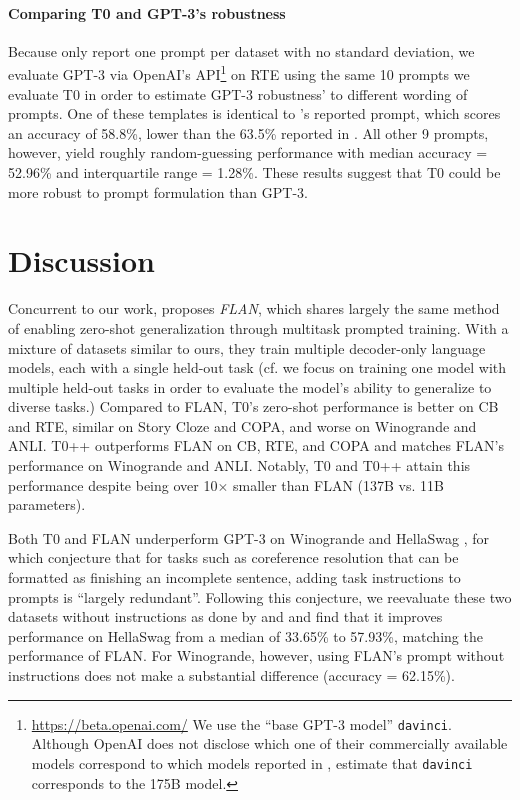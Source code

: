 \paragraph{Comparing T0 and GPT-3's robustness} Because \citet{gpt3} only report one prompt per dataset with no standard deviation, we evaluate GPT-3 via OpenAI's API\footnote{\url{https://beta.openai.com/} We use the “base GPT-3 model” \texttt{davinci}. Although OpenAI does not disclose which one of their commercially available models correspond to which models reported in \citet{gpt3}, \citet{eval-harness} estimate that \texttt{davinci} corresponds to the 175B model.} on RTE using the same 10 prompts we evaluate T0 in order to estimate GPT-3 robustness' to different wording of prompts. One of these templates is identical to \citet[p. 59]{gpt3}'s reported prompt, which scores an accuracy of 58.8\%, lower than the 63.5\% reported in \citet{gpt3}. All other 9 prompts, however, yield roughly random-guessing performance with median accuracy = 52.96\% and interquartile range = 1.28\%. These results suggest that T0 could be more robust to prompt formulation than GPT-3.

\section{Discussion}
\label{sec:disc}

Concurrent to our work, \citet{flan} proposes \textit{FLAN}, which shares largely the same method of enabling zero-shot generalization through multitask prompted training. With a mixture of datasets similar to ours, they train multiple decoder-only language models, each with a single held-out task (cf. we focus on training one model with multiple held-out tasks in order to evaluate the model's ability to generalize to diverse tasks.) Compared to FLAN, T0's zero-shot performance is better on CB and RTE, similar on Story Cloze and COPA, and worse on Winogrande and ANLI. T0++ outperforms FLAN on CB, RTE, and COPA and matches FLAN's performance on Winogrande and ANLI. Notably, T0 and T0++ attain this performance despite being over 10$\times$ smaller than FLAN (137B vs. 11B parameters). 

Both T0 and FLAN underperform GPT-3 on Winogrande and HellaSwag \citep{ai2:winogrande,zellers2019hellaswag}, for which \citet{flan} conjecture that for tasks such as coreference resolution that can be formatted as ﬁnishing an incomplete sentence, adding task instructions to prompts is “largely redundant”. Following this conjecture, we reevaluate these two datasets without instructions as done by \citet{flan} and \citet{gpt3} and find that it improves performance on HellaSwag from a median of 33.65\% to 57.93\%, matching the performance of FLAN. For Winogrande, however, using FLAN's prompt without instructions does not make a substantial difference (accuracy = 62.15\%).

